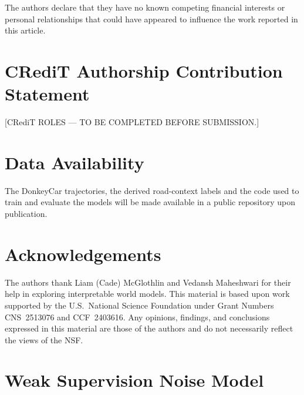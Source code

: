 \documentclass[preprint,12pt]{elsarticle}
\begin{document}
The authors declare that they have no known competing financial interests or
personal relationships that could have appeared to influence the work reported in
this article.

\section*{CRediT Authorship Contribution Statement}

[CRediT ROLES --- TO BE COMPLETED BEFORE SUBMISSION.]

\section*{Data Availability}

The DonkeyCar trajectories, the derived road-context labels and the code used to
train and evaluate the models will be made available in a public repository upon
publication.

\section*{Acknowledgements}

The authors thank Liam (Cade) McGlothlin and Vedansh Maheshwari for their help in
exploring interpretable world models.
This material is based upon work supported by the U.S.\ National Science Foundation
under Grant Numbers CNS~2513076 and CCF~2403616.
Any opinions, findings, and conclusions expressed in this material are those of the
authors and do not necessarily reflect the views of the NSF.


\appendix
\section{Weak Supervision Noise Model}\label{sec:interp_loss_def}
\end{document}

